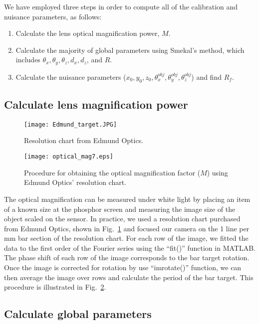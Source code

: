 We have employed three steps in order to compute all of the calibration and nuisance parameters, as follows:
%
\begin{enumerate}
\item Calculate the lens optical magnification power, $M$.
\item Calculate the majority of global parameters using Smekal's method, which includes $\theta_x, \theta_y, \theta_z, d_x, d_z$, and $R$.
\item Calculate the nuisance parameters ($x_0, y_0, z_0, \theta^{obj}_x, \theta^{obj}_y, \theta^{obj}_z$) and find $R_f$.
\end{enumerate}

\subsection{Calculate lens magnification power}
\begin{figure}[ht]
\centering
\texttt{[image: Edmund\_target.JPG]}
\caption{Resolution chart from Edmund Optics.}
\label{fig:edmund_target}
\end{figure}

\begin{figure}[ht]
\centering
\texttt{[image: optical\_mag7.eps]}
\caption{Procedure for obtaining the optical magnification factor ($M$) using Edmund Optics' resolution chart.}
\label{fig:optical_mag}
\end{figure}

The optical magnification can be measured under white light by placing an item of a known size at the phosphor screen and measuring the image size of the object scaled on the sensor.  In practice, we used a resolution chart purchased from Edmund Optics, shown in Fig.~\ref{fig:edmund_target} and focused our camera on the 1 line per mm bar section of the resolution chart.  For each row of the image, we fitted the data to the first order of the Fourier series using the ``fit()'' function in MATLAB.  The phase shift of each row of the image corresponds to the bar target rotation.  Once the image is corrected for rotation by use ``imrotate()'' function, we can then average the image over rows and calculate the period of the bar target.  This procedure is illustrated in Fig.~\ref{fig:optical_mag}.

\subsection{Calculate global parameters}

